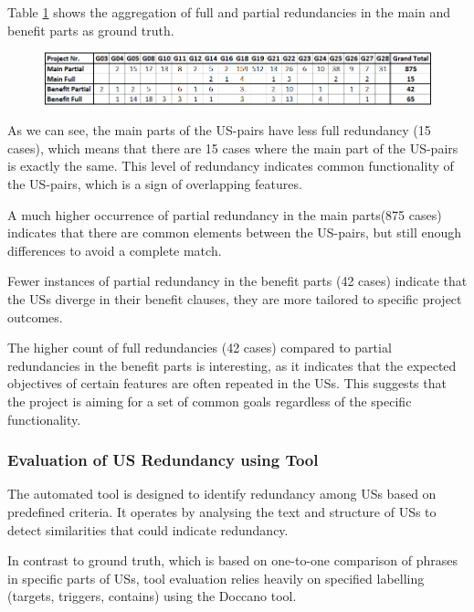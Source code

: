 Table \ref{tb:ground_truth} shows the aggregation of full and partial redundancies in the main and benefit parts as ground truth.
\begin{figure}[h]
	\begingroup
	\scriptsize
	\centering
	\includegraphics[scale=0.6]{Table/ground_truth.png}
	\label{tb:ground_truth}
	
	\endgroup
\end{figure}
As we can see, the main parts of the US-pairs have less full redundancy (15 cases), which means that there are 15 cases where the main part of the US-pairs is exactly the same. This level of redundancy indicates common functionality of the US-pairs, which is a sign of overlapping features. 

A much higher occurrence of partial redundancy in the main parts(875 cases) indicates that there are common elements between the US-pairs, but still enough differences to avoid a complete match. 

Fewer instances of partial redundancy in the benefit parts (42 cases) indicate that the USs diverge in their benefit clauses, they are more tailored to specific project outcomes. 

The higher count of full redundancies (42 cases) compared to partial redundancies in the benefit parts is interesting, as it indicates that the expected objectives of certain features are often repeated in the USs. This suggests that the project is aiming for a set of common goals regardless of the specific functionality.
\subsubsection*{Evaluation of US Redundancy using Tool}
The automated tool is designed to identify redundancy among USs based on predefined criteria. It operates by analysing the text and structure of USs to detect similarities that could indicate redundancy.

In contrast to ground truth, which is based on one-to-one comparison of phrases in specific parts of USs, tool evaluation relies heavily on specified labelling (targets, triggers, contains) using the Doccano tool.

